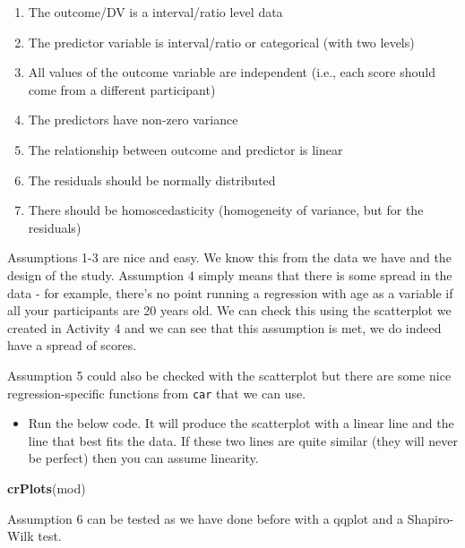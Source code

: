 \documentclass[]{book}
\newenvironment{Shaded}{\begin{snugshade}}{\end{snugshade}}
\newcommand{\KeywordTok}[1]{\textcolor[rgb]{0.13,0.29,0.53}{\textbf{#1}}}
\newcommand{\NormalTok}[1]{#1}
\newcommand{\OperatorTok}[1]{\textcolor[rgb]{0.81,0.36,0.00}{\textbf{#1}}}
\providecommand{\tightlist}{%
  \setlength{\itemsep}{0pt}\setlength{\parskip}{0pt}}
\begin{document}
\begin{enumerate}
\def\labelenumi{\arabic{enumi}.}
\tightlist
\item
  The outcome/DV is a interval/ratio level data
\item
  The predictor variable is interval/ratio or categorical (with two levels)
\item
  All values of the outcome variable are independent (i.e., each score should come from a different participant)
\item
  The predictors have non-zero variance
\item
  The relationship between outcome and predictor is linear
\item
  The residuals should be normally distributed
\item
  There should be homoscedasticity (homogeneity of variance, but for the residuals)
\end{enumerate}

Assumptions 1-3 are nice and easy. We know this from the data we have and the design of the study. Assumption 4 simply means that there is some spread in the data - for example, there's no point running a regression with age as a variable if all your participants are 20 years old. We can check this using the scatterplot we created in Activity 4 and we can see that this assumption is met, we do indeed have a spread of scores.

Assumption 5 could also be checked with the scatterplot but there are some nice regression-specific functions from \texttt{car} that we can use.

\begin{itemize}
\tightlist
\item
  Run the below code. It will produce the scatterplot with a linear line and the line that best fits the data. If these two lines are quite similar (they will never be perfect) then you can assume linearity.
\end{itemize}

\begin{Shaded}
\begin{Highlighting}[]
\KeywordTok{crPlots}\NormalTok{(mod)}
\end{Highlighting}
\end{Shaded}

Assumption 6 can be tested as we have done before with a qqplot and a Shapiro-Wilk test.

\begin{Shaded}
\end{Shaded}
\end{document}
